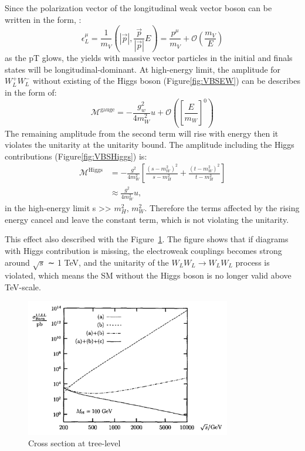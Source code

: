 Since the polarization vector of the longitudinal weak vector boson can be written in the form, \cite{Rindani_2009}: 
\begin{equation}
\epsilon_{L}^{\mu}=\frac{1}{m_{V}}\left(|\vec{p}|, \frac{\vec{p}}{|\vec{p}|} E\right)=\frac{p^{\mu}}{m_{V}}+\mathcal{O}\left(\frac{m_{V}}{E}\right)
\end{equation}
as the pT glows, the yields with massive vector particles in the initial and finals states will be longitudinal-dominant.
At high-energy limit, the amplitude for $W_L^+W_L^-$ without existing of the Higgs boson (Figure\ref{fig:VBSEW}) can be describes in the form of:
\begin{equation}
\mathcal{M}^{\text {gauge}}=-\frac{g_{w}^{2}}{4 m_{W}^{2}} u+\mathcal{O}\left(\left[\frac{E}{m_{W}}\right]^{0}\right)
\end{equation}
The remaining amplitude from the second term will rise with energy then it violates the unitarity at the unitarity bound. The amplitude including the Higgs contributions (Figure\ref{fig:VBSHiggs}) is:
\begin{equation}
\begin{aligned}
\mathcal{M}^{\text {Higgs}} &=-\frac{g^{2}}{4 m_{W}^{2}}\left[\frac{\left(s-m_{W}^{2}\right)^{2}}{s-m_{H}^{2}}+\frac{\left(t-m_{W}^{2}\right)^{2}}{t-m_{H}^{2}}\right] \\
& \approx \frac{g^{2}}{4 m_{W}^{2}} u,
\end{aligned}
\end{equation}
in the high-energy limit s >> $m_{H}^{2}$, $m_{W}^{2}$.
Therefore the terms affected by the rising energy cancel and leave the constant term, which is not violating the unitarity.

This effect also described with the Figure~\ref{fig:violation}.
The figure shows that if diagrams with Higgs contribution is missing, the electroweak couplings becomes strong around $\sqrt{s}$ ∼ 1 TeV, and the unitarity of the $W_LW_L \rightarrow W_LW_L$ process is violated, which means the SM without the Higgs boson is no longer valid above TeV-scale. 

\begin{figure}[tbp]
\begin{center}
 \includegraphics[width=0.80\textwidth,keepaspectratio]{figures/violation}
\caption{
Cross section at tree-level %
}
\label{fig:violation}
\end{center}
\end{figure}

